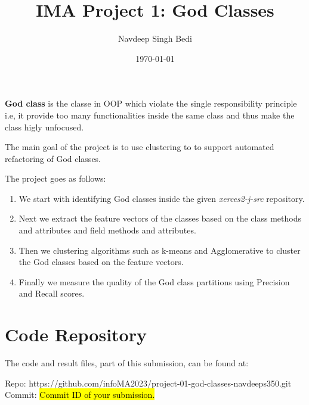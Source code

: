 \documentclass{article}
\title{IMA Project 1: God Classes}
\author{{Navdeep Singh Bedi} }
\date{\today}
\newcommand\templateInstruction[1]{
\hl{#1}
}
\begin{document}
\setcounter{section}{-1}

\maketitle



\textbf{God class} is the classe in OOP which violate the single responsibility principle i.e, it provide
too many functionalities inside the same class and thus make the class higly unfocused.

The main goal of the project is to use clustering to to support automated refactoring of God classes. 

The project goes as follows: 

\begin{enumerate}
    \item We start with identifying God classes inside the given \textit{xerces2-j-src} repository.
    \item Next we extract the feature vectors of the classes based on the class methods and attributes and field methods and attributes.
    \item Then we clustering algorithms such as k-means and Agglomerative to cluster the God classes based on the feature vectors.
    \item Finally we measure the quality of the God class partitions using Precision and Recall scores.
\end{enumerate}

\section{Code Repository}

The code and result files, part of this submission, can be found at:

\begin{center}
    Repo: {https://github.com/infoMA2023/project-01-god-classes-navdeeps350.git} \\
    Commit: \templateInstruction{Commit ID of your submission.}
\end{center}
\end{document}
